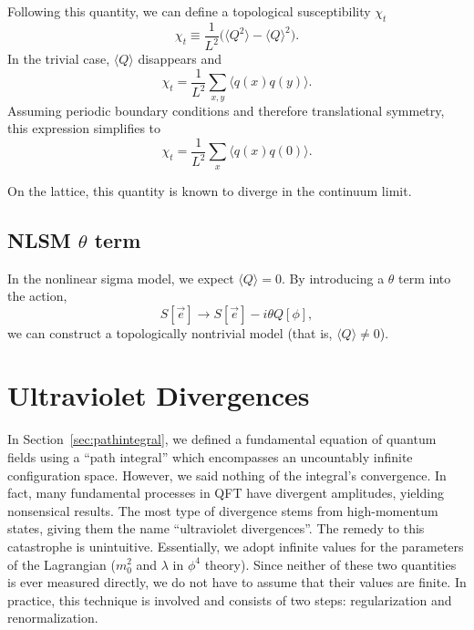 \documentclass[12pt]{report}
\newcommand{\e}{\vec e}
\begin{document}
Following this quantity, we can define a topological susceptibility $\chi_t$
\begin{equation}
\chi_t \equiv \frac{1}{L^2} \Big( \langle Q^2 \rangle - \langle Q \rangle^2 \Big).
\end{equation}
In the trivial case, $\langle Q \rangle$ disappears and   
\begin{equation}
    \chi_t = \frac{1}{L^2} \sum_{x,y} \langle q(x)q(y)\rangle.
\end{equation}
Assuming periodic boundary conditions and therefore translational symmetry, this expression simplifies to 
\begin{equation}
    \chi_t = \frac{1}{L^2} \sum_{x} \langle q(x)q(0)\rangle.
\end{equation}

On the lattice, this quantity is known to diverge in the continuum limit.\cite{bietenholz2018}

\subsection{NLSM $\theta$ term}

In the nonlinear sigma model, we expect $\langle Q \rangle=0$. By introducing a $\theta$ term into the action,
\begin{equation}
    S[\e] \rightarrow S[\e] - i \theta Q[\phi],
\end{equation}
we can construct a topologically nontrivial model (that is, $\langle Q \rangle \neq 0$).

\section{Ultraviolet Divergences}

In Section~\ref{sec:pathintegral},  we defined a fundamental equation of quantum fields using a ``path integral'' which encompasses an uncountably infinite configuration space. However, we said nothing of the integral's convergence. In fact, many fundamental processes in QFT have divergent amplitudes, yielding nonsensical results. The most type of divergence stems from high-momentum states, giving them the name ``ultraviolet divergences''. The remedy to this catastrophe is unintuitive. Essentially, we adopt infinite values for the parameters of the Lagrangian ($m_0^2$ and $\lambda$ in $\phi^4$ theory). Since neither of these two quantities is ever measured directly, we do not have to assume that their values are finite. In practice, this technique is involved and consists of two steps: regularization and renormalization.
\end{document}
